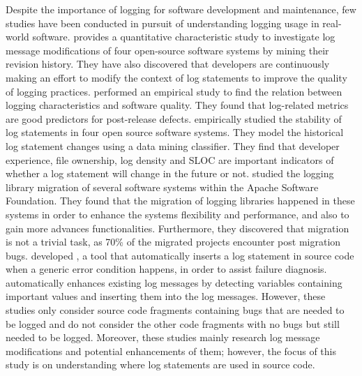 Despite the importance of logging for software development and maintenance, few studies have been conducted in pursuit of understanding logging usage in real-world software. \citet{yuan2012characterizing} provides a quantitative characteristic study to investigate log message modifications of four open-source software systems by mining their revision history.  They have also discovered that developers are continuously making an effort to modify the context of log statements to improve the quality of logging practices. \citet{shang2015studying} performed an empirical study to find the relation between logging characteristics and software quality. They found that log-related metrics are good predictors for post-release defects. \citet{kabinna2016examining} empirically studied the stability of log statements in four open source software systems. They model the historical log statement changes using a data mining classifier. They find that developer experience, file ownership, log density and SLOC are important indicators of whether a log statement will change in the future or not. 
\citet{kabinna2016logging} studied the logging library migration of several software systems within the Apache Software Foundation. They found that the migration of logging libraries happened in these systems in order to enhance the system\textquotesingle s flexibility and performance, and also to gain more advances functionalities. Furthermore, they discovered that migration is not a trivial task, as 70\% of the migrated projects encounter post migration bugs.
\citet{yuan2012conservative} developed , a tool that automatically inserts a log statement in source code when a generic error condition happens, in order to assist failure diagnosis.  \cite{yuan2012improving} automatically enhances existing log messages by detecting variables containing important values and inserting them into the log messages. However, these studies only consider source code fragments containing bugs that are needed to be logged and do not consider the other code fragments with no bugs but still needed to be logged. Moreover, these studies mainly research log message modifications and potential enhancements of them; however, the focus of this study is on understanding where log statements are used in source code.

